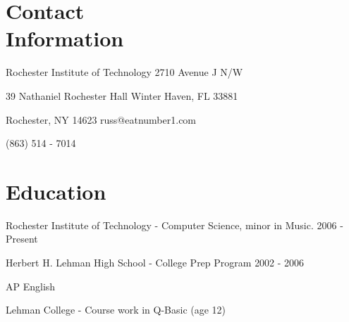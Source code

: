 \documentclass[margin,line]{resume}
\begin{document}
\begin{resume}

\section{\mysidestyle Contact\\Information}\vspace{2mm}
	\begin{asparablank}
		\item Rochester Institute of Technology \hfill 2710 Avenue J N/W
		\item 39 Nathaniel Rochester Hall \hfill Winter Haven, FL 33881
		\item Rochester, NY 14623 \hfill russ@eatnumber1.com
		\item \hfill (863) 514 - 7014
	\end{asparablank}

\section{\mysidestyle Education}
		\begin{compactdesc}
			\item[Rochester Institute of Technology] - Computer Science, minor
			in Music. \hfill {\footnotesize 2006 - Present}
			\item[Herbert H. Lehman High School] - College Prep Program \hfill
			{\footnotesize 2002 - 2006}
			\begin{compactitem}
				\item {\small AP English}
			\end{compactitem}
			\item[Lehman College] - Course work in Q-Basic (age 12)
		\end{compactdesc}


\end{resume}
\end{document}
